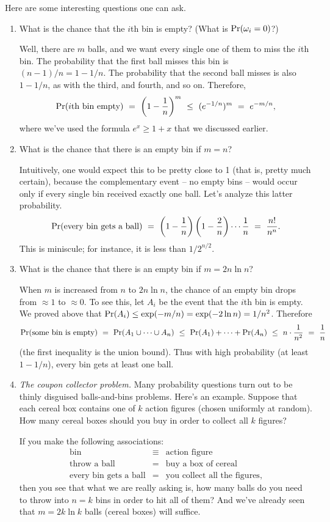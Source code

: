 Here are some interesting questions one can ask.
\begin{enumerate}
\item What is the chance that the $i$th bin is empty? (What is $\mbox{\rm Pr}(\omega_i = 0)$?)

Well, there are $m$ balls, and we want every single one of them to miss the $i$th bin. The probability that the first ball misses this bin is $(n-1)/n = 1 - 1/n$. The probability that the second ball misses is also $1- 1/n$, as with the third, and fourth, and so on. Therefore,
$$ \pr(\mbox{$i$th bin empty}) 
\ = \ 
\left( 1 - \frac{1}{n} \right)^m
\ \leq \ 
(e^{-1/n})^m 
\ = \ 
e^{-m/n},
$$
where we've used the formula $e^x \geq 1+x$ that we discussed earlier.

\item What is the chance that there is an empty bin if $m = n$?

Intuitively, one would expect this to be pretty close to 1 (that is, pretty much certain), because the complementary event -- no empty bins -- would occur only if every single bin received exactly one ball. Let's analyze this latter probability.
$$
\pr(\mbox{every bin gets a ball}) 
\ = \ 
\left(1 - \frac{1}{n}\right) \left( 1- \frac{2}{n}\right) \cdots \frac{1}{n} 
\ = \ 
\frac{n!}{n^n}.
$$
This is miniscule; for instance, it is less than $1/2^{n/2}$.

\item What is the chance that there is an empty bin if $m = 2n\ln n$?

When $m$ is increased from $n$ to $2n \ln n$, the chance of an empty bin drops from $\approx 1$ to $\approx 0$. To see this, let $A_i$ be the event that the $i$th bin is empty. We proved above that $\mbox{\rm Pr}(A_i) \leq \exp(-m/n) = \exp(-2\ln n) = 1/n^2$. Therefore
$$
\pr(\mbox{some bin is empty}) 
\ = \ 
\pr(A_1 \cup \cdots \cup A_n) 
\ \leq \ 
\pr(A_1) + \cdots + \pr(A_n)
\ \leq \ 
n \cdot \frac{1}{n^2}
\ = \ 
\frac{1}{n}
$$
(the first inequality is the union bound). Thus with high probability (at least $1-1/n$), every bin gets at least one ball.

\item {\it The coupon collector problem.} Many probability questions turn out to be thinly disguised balls-and-bins problems. Here's an example. Suppose that each cereal box contains one of $k$ action figures (chosen uniformly at random). How many cereal boxes should you buy in order to collect all $k$ figures?

If you make the following associations:
\begin{eqnarray*}
\mbox{bin} & \equiv & \mbox{action figure} \\
\mbox{throw a ball} & = & \mbox{buy a box of cereal} \\
\mbox{every bin gets a ball} & = & \mbox{you collect all the figures},
\end{eqnarray*}
then you see that what we are really asking is, how many balls do you need to throw into $n = k$ bins in order to hit all of them? And we've already seen that $m = 2k\ln k$ balls (cereal boxes) will suffice.


\end{enumerate}
